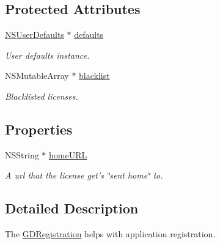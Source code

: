 \subsection*{Protected Attributes}
\begin{DoxyCompactItemize}
\item 
\hypertarget{interface_g_d_registration_a951a74df6032c61bdc6215df98dfc10f}{
\hyperlink{class_n_s_user_defaults}{NSUserDefaults} $\ast$ \hyperlink{interface_g_d_registration_a951a74df6032c61bdc6215df98dfc10f}{defaults}}
\label{interface_g_d_registration_a951a74df6032c61bdc6215df98dfc10f}

\begin{DoxyCompactList}\small\item\em User defaults instance. \item\end{DoxyCompactList}\item 
\hypertarget{interface_g_d_registration_a2cec9ccef516bf4ecbf55de00bf0dbda}{
NSMutableArray $\ast$ \hyperlink{interface_g_d_registration_a2cec9ccef516bf4ecbf55de00bf0dbda}{blacklist}}
\label{interface_g_d_registration_a2cec9ccef516bf4ecbf55de00bf0dbda}

\begin{DoxyCompactList}\small\item\em Blacklisted licenses. \item\end{DoxyCompactList}\end{DoxyCompactItemize}
\subsection*{Properties}
\begin{DoxyCompactItemize}
\item 
NSString $\ast$ \hyperlink{interface_g_d_registration_a8b801d18afbdb3062e0a79f39d0aee66}{homeURL}
\begin{DoxyCompactList}\small\item\em A url that the license get's \char`\"{}sent home\char`\"{} to. \item\end{DoxyCompactList}\end{DoxyCompactItemize}


\subsection{Detailed Description}
The \hyperlink{interface_g_d_registration}{GDRegistration} helps with application registration. 

